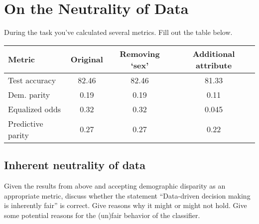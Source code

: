 
\usepackage{hyperref}
\usepackage{booktabs}
\usepackage{comment}
\usepackage{natbib}
\usepackage{bbm}
\usepackage{mathtools}
\usepackage{amsfonts}
\usepackage{appendix}
\usepackage{csquotes}
\usepackage{amssymb}
\usepackage{listings}
\usepackage{float}
\usepackage{pgfplots}
\usepackage{tikz}
\usepackage{bigints}
\usepackage{amsmath}
\lstset{
    frame = single,
    breaklines=true,
    basicstyle=\ttfamily}
\usepackage{tikz, forest}
\usepackage{natbib}

\DeclareMathOperator*{\maximize}{maximize}
\DeclareMathOperator*{\minimize}{minimize}





\section{On the Neutrality of Data}
During the task you've calculated several metrics. Fill out the table below.

\begin{center}

\begin{tabular}{l c c c}
\toprule
\textbf{Metric} & \textbf{Original } & \textbf{Removing `sex'} & \textbf{Additional attribute} \\
\midrule
Test accuracy & 82.46 & 82.46 & 81.33\\
Dem. parity & 0.19 & 0.19 & 0.11\\
Equalized odds & 0.32 & 0.32 & 0.045\\
Predictive parity & 0.27 & 0.27 & 0.22\\
\bottomrule
\end{tabular}

\end{center}


\setcounter{subsection}{3}
\subsection{Inherent neutrality of data}
Given the results from above and accepting demographic disparity as an appropriate metric, discuss whether the statement ``Data-driven decision making is inherently fair” is correct. Give reasons why it might or might not hold. Give some potential reasons for the (un)fair behavior of the classifier.\\

